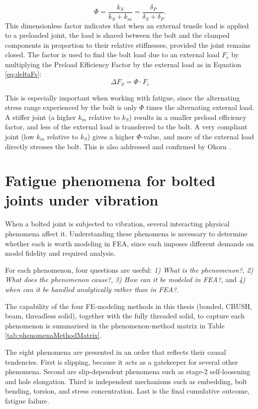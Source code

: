\documentclass[a4paper,twoside]{bth}
\begin{document}
\begin{equation} \label{eq:PreloadFactor}
    \Phi = \frac{k_S}{k_S+k_m} = \frac{\delta_P}{\delta_S + \delta_P}.
\end{equation}
This dimensionless factor indicates that when an external tensile load is applied to a preloaded joint, the load is shared between the bolt and the clamped components in proportion to their relative stiffnesses, provided the joint remains closed. The factor is used to find the bolt load due to an external load $F_e$ by multiplying the Preload Efficiency Factor by the external load as in Equation \ref{eq:deltaFs}:
\begin{equation} \label{eq:deltaFs}
    \Delta F_S = \Phi \cdot F_e    
\end{equation}

This is especially important when working with fatigue, since the alternating stress range experienced by the bolt is only $\Phi$ times the alternating external load. A stiffer joint (a higher $k_m$ relative to $k_S$) results in a smaller preload efficiency factor, and less of the external load is transferred to the bolt. A very compliant joint (low $k_m$ relative to $k_S$) gives a higher $\Phi$-value, and more of the external load directly stresses the bolt. This is also addressed and confirmed by Okorn \cite{30}.


\section{Fatigue phenomena for bolted joints under vibration} \label{sec:fatiguePhenomena}
When a bolted joint is subjected to vibration, several interacting physical phenomena affect it. Understanding these phenomena is necessary to determine whether each is worth modeling in \ac{FEA},  since each imposes different demands on model fidelity and required analysis. 

For each phenomenon, four questions are useful: \textit{1) What is the phenomenon?}, \textit{2) What does the phenomenon cause?}, \textit{3) How can it be modeled in \ac{FEA}?}, and \textit{4) when can it be handled analytically rather than in \ac{FEA}?}.

The capability of the four FE-modeling methods in this thesis (bonded, CBUSH, beam, threadless solid), together with the fully threaded solid, to capture each phenomenon is summarised in the phenomenon-method matrix in Table \ref{tab:phenomenaMethodMatrix}.

The eight phenomena are presented in an order that reflects their causal tendencies. First is slipping, because it acts as a gatekeeper for several other phenomena. Second are slip-dependent phenomena such as stage-2 self-loosening and hole elongation. Third is independent mechanisms such as embedding, bolt bending, torsion, and stress concentration. Last is the final cumulative outcome, fatigue failure.
\end{document}
